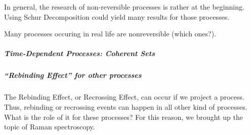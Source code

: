 In general, the research of non-reversible processes is rather at the beginning. Using Schur Decomposition could yield many results for those processes.

Many processes occuring in real life are nonreversible (which ones?).


\subparagraph*{Time-Dependent Processes: Coherent Sets}

\subparagraph*{``Rebinding Effect'' for other processes}
The Rebinding Effect, or Recrossing Effect, can occur if we project a process. Thus, rebinding or recrossing events can happen in all other kind of processes. What is the role of it for these processes? 
For this reason, we brought up the topic of Raman spectroscopy.

